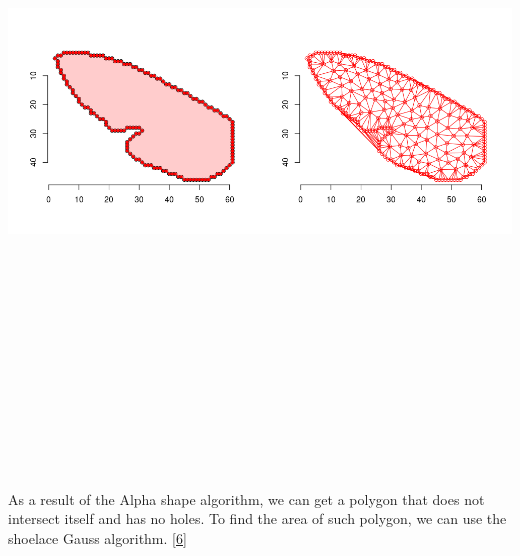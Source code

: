 \documentclass[
]{article}
\let\origfigure\figure
\let\endorigfigure\endfigure
\renewenvironment{figure}[1][2] {
    \expandafter\origfigure\expandafter[H]
} {
    \endorigfigure
}
\begin{document}
\begin{figure}
\centering
\includegraphics[width=\textwidth,height=7.29167in]{./img/Alpha_shape_0.png}
\caption{Concave Hull of a wing object}
\end{figure}

As a result of the Alpha shape algorithm, we can get a polygon that does
not intersect itself and has no holes. To find the area of such polygon,
we can use the shoelace Gauss algorithm.
{[}\protect\hyperlink{ref-Shoelace-formula}{6}{]}
\end{document}
